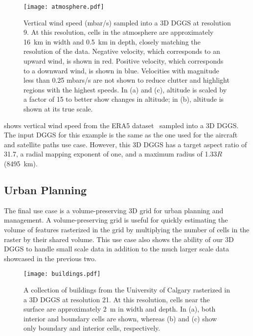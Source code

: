 \begin{figure}[ht!]
	\centering
	\texttt{[image: atmosphere.pdf]}
	\caption[Atmospheric properties resampling use case showing vertical wind speed]{
		Vertical wind speed (mbar/s) sampled into a 3D DGGS at resolution 9.
		At this resolution, cells in the atmosphere are approximately 16~km in width and 0.5~km in depth, closely matching the resolution of the data.
		Negative velocity, which corresponds to an upward wind, is shown in red.
		Positive velocity, which corresponds to a downward wind, is shown in blue.
		Velocities with magnitude less than 0.25 mbars/s are not shown to reduce clutter and highlight regions with the highest speeds.
		In (a) and (c), altitude is scaled by a factor of 15 to better show changes in altitude; in (b), altitude is shown at its true scale.
	}
	\label{fig:atmosphere}
\end{figure}


 shows vertical wind speed from the ERA5 dataset~\cite{era5} sampled into a 3D DGGS.
The input DGGS for this example is the same as the one used for the aircraft and satellite paths use case.
However, this 3D DGGS has a target aspect ratio of 31.7, a radial mapping exponent of one, and a maximum radius of 1.33$R$ (8495~km).


\subsection{Urban Planning} \label{chap:8:buildings}
The final use case is a volume-preserving 3D grid for urban planning and management.
A volume-preserving grid is useful for quickly estimating the volume of features rasterized in the grid by multiplying the number of cells in the raster by their shared volume.
This use case also shows the ability of our 3D DGGS to handle small scale data in addition to the much larger scale data showcased in the previous two.


\begin{figure}[ht!]
	\centering
	\texttt{[image: buildings.pdf]}
	\caption[Urban planning use case showing various rasterized buildings]{
		A collection of buildings from the University of Calgary rasterized in a 3D DGGS at resolution 21.
		At this resolution, cells near the surface are approximately 2~m in width and depth.
		In (a), both interior and boundary cells are shown, whereas (b) and (c) show only boundary and interior cells, respectively.
	}
	\label{fig:urbanplanning}
\end{figure}


